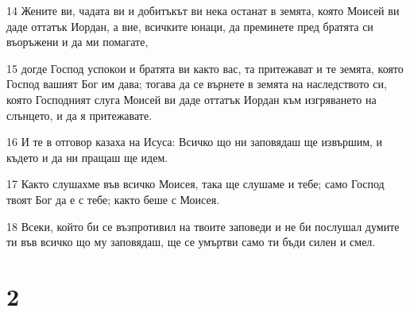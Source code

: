 \par 14 Жените ви, чадата ви и добитъкът ви нека останат в земята, която Моисей ви даде оттатък Иордан, а вие, всичките юнаци, да преминете пред братята си въоръжени и да ми помагате,
\par 15 догде Господ успокои и братята ви както вас, та притежават и те земята, която Господ вашият Бог им дава; тогава да се върнете в земята на наследството си, която Господният слуга Моисей ви даде оттатък Иордан към изгряването на слънцето, и да я притежавате.
\par 16 И те в отговор казаха на Исуса: Всичко що ни заповядаш ще извършим, и където и да ни пращаш ще идем.
\par 17 Както слушахме във всичко Моисея, така ще слушаме и тебе; само Господ твоят Бог да е с тебе; както беше с Моисея.
\par 18 Всеки, който би се възпротивил на твоите заповеди и не би послушал думите ти във всичко що му заповядаш, ще се умъртви само ти бъди силен и смел.

\chapter{2}

